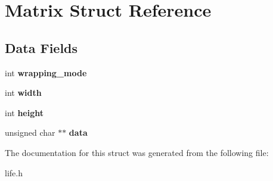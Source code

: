 \hypertarget{struct_matrix}{\section{Matrix Struct Reference}
\label{struct_matrix}
}
\subsection*{Data Fields}
\begin{DoxyCompactItemize}
\item 
\hypertarget{struct_matrix_ad0e58938c13ae264d2c7e39d0b4ac87b}{int {\bfseries wrapping\-\_\-mode}}\label{struct_matrix_ad0e58938c13ae264d2c7e39d0b4ac87b}

\item 
\hypertarget{struct_matrix_a2474a5474cbff19523a51eb1de01cda4}{int {\bfseries width}}\label{struct_matrix_a2474a5474cbff19523a51eb1de01cda4}

\item 
\hypertarget{struct_matrix_ad12fc34ce789bce6c8a05d8a17138534}{int {\bfseries height}}\label{struct_matrix_ad12fc34ce789bce6c8a05d8a17138534}

\item 
\hypertarget{struct_matrix_aa40cc77104d7e3915c2aca68cb59dce2}{unsigned char $\ast$$\ast$ {\bfseries data}}\label{struct_matrix_aa40cc77104d7e3915c2aca68cb59dce2}

\end{DoxyCompactItemize}


The documentation for this struct was generated from the following file\-:\begin{DoxyCompactItemize}
\item 
life.\-h\end{DoxyCompactItemize}
